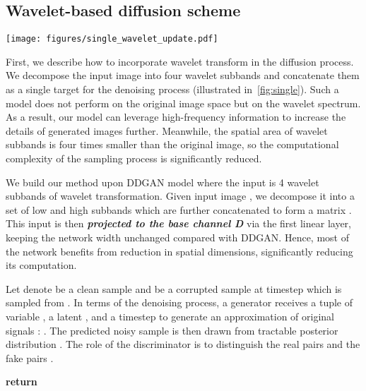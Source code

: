 \documentclass[10pt,twocolumn,letterpaper]{article}
\begin{document}
\subsection{Wavelet-based diffusion scheme}\label{sec:wavelet_diffusion}
\begin{figure*}[t]
  \centering
\texttt{[image: figures/single\_wavelet\_update.pdf]}
   \vspace{-3mm}
   \caption{Illustration of Wavelet-based diffusion scheme. It performs denoising on wavelet space instead of pixel space. At each step , a less-noisy sample  is generated by a denoiser  with parameters . After obtaining the clean sample  through  steps, it is used to reconstruct the final image via Inverse wavelet transformation (IWT).}
   \label{fig:single}
\end{figure*}

First, we describe how to incorporate wavelet transform in the diffusion process. We decompose the input image into four wavelet subbands and concatenate them as a single target for the denoising process (illustrated in~\cref{fig:single}). Such a model does not perform on the original image space but on the wavelet spectrum. As a result, our model can leverage high-frequency information to increase the details of generated images further. Meanwhile, the spatial area of wavelet subbands is four times smaller than the original image, so the computational complexity of the sampling process is significantly reduced. 

We build our method upon DDGAN model where the input is 4 wavelet subbands of wavelet transformation. Given input image , we decompose it into a set of low and high subbands which are further concatenated to form a matrix . This input is then \textbf{\textit{projected to the base channel D}} via the first linear layer, keeping the network width unchanged compared with DDGAN. Hence, most of the network benefits from  reduction in spatial dimensions, significantly reducing its computation.

Let denote  be a clean sample and  be a corrupted sample at timestep  which is sampled from . In terms of the denoising process, a generator receives a tuple of variable , a latent , and a timestep  to generate an approximation of original signals : . The predicted noisy sample  is then drawn from tractable posterior distribution . The role of the discriminator is to distinguish the real pairs  and the fake pairs .


\begin{algorithm}[t]
\caption{Wavelet-based sampling process}
\label{alg:singlescale_sample}
\centering
\small
\begin{algorithmic}
\State 

\For{}
    \State 
    \State 
    \State 
\EndFor
\State 
\State \textbf{return} 
\end{algorithmic}
\end{algorithm}
\end{document}
